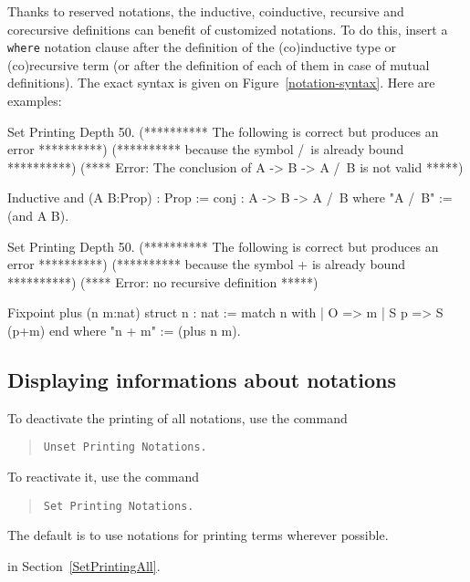 Thanks to reserved notations, the inductive, coinductive, recursive
and corecursive definitions can benefit of customized notations. To do
this, insert a {\tt where} notation clause after the definition of the
(co)inductive type or (co)recursive term (or after the definition of
each of them in case of mutual definitions). The exact syntax is given
on Figure~\ref{notation-syntax}. Here are examples:

\begin{coq_eval}
Set Printing Depth 50.
(********** The following is correct but produces an error **********)
(********** because the symbol /\ is already bound **********)
(**** Error: The conclusion of A -> B -> A /\ B is not valid *****)
\end{coq_eval}

\begin{coq_example*}
Inductive and (A B:Prop) : Prop := conj : A -> B -> A /\ B 
where "A /\ B" := (and A B).
\end{coq_example*}

\begin{coq_eval}
Set Printing Depth 50.
(********** The following is correct but produces an error **********)
(********** because the symbol + is already bound **********)
(**** Error: no recursive definition *****)
\end{coq_eval}

\begin{coq_example*}
Fixpoint plus (n m:nat) {struct n} : nat :=
  match n with
  | O => m
  | S p => S (p+m)
  end
where "n + m" := (plus n m).
\end{coq_example*}

\subsection{Displaying informations about notations
}

To deactivate the printing of all notations, use the command
\begin{quote}
\tt Unset Printing Notations.
\end{quote}
To reactivate it, use the command
\begin{quote}
\tt Set Printing Notations.
\end{quote}
The default is to use notations for printing terms wherever possible.

 in Section~\ref{SetPrintingAll}.

